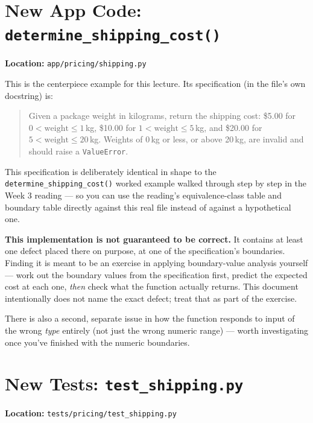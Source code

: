 \documentclass[11pt]{article}
\begin{document}
\section{New App Code: \texttt{determine\_shipping\_cost()}}
\textbf{Location:} \texttt{app/pricing/shipping.py}

This is the centerpiece example for this lecture. Its specification (in
the file's own docstring) is:

\begin{quote}
Given a package weight in kilograms, return the shipping cost: \$5.00 for
$0 < \text{weight} \leq 1$\,kg, \$10.00 for $1 < \text{weight} \leq
5$\,kg, and \$20.00 for $5 < \text{weight} \leq 20$\,kg. Weights of
0\,kg or less, or above 20\,kg, are invalid and should raise a
\texttt{ValueError}.
\end{quote}

This specification is deliberately identical in shape to the
\texttt{determine\_shipping\_cost()} worked example walked through
step by step in the Week 3 reading --- so you can use the reading's
equivalence-class table and boundary table directly against this real
file instead of against a hypothetical one.

\begin{warningbox}
\textbf{This implementation is not guaranteed to be correct.} It
contains at least one defect placed there on purpose, at one of the
specification's boundaries. Finding it is meant to be an exercise in
applying boundary-value analysis yourself --- work out the boundary
values from the specification first, predict the expected cost at each
one, \emph{then} check what the function actually returns. This document
intentionally does not name the exact defect; treat that as part of the
exercise.
\end{warningbox}

There is also a second, separate issue in how the function responds to
input of the wrong \emph{type} entirely (not just the wrong numeric
range) --- worth investigating once you've finished with the numeric
boundaries.

\section{New Tests: \texttt{test\_shipping.py}}
\textbf{Location:} \texttt{tests/pricing/test\_shipping.py}
\end{document}
